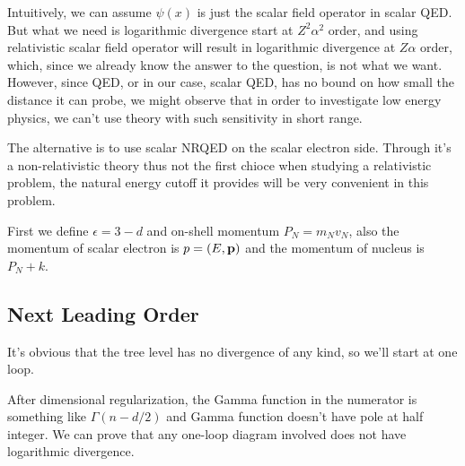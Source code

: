 \documentclass[aps,prd,preprint,showkeys,notitlepage,10pt]{revtex4-1}
\newcommand{\vbp}{\vb{p}}
\renewcommand{\a}{\alpha}
\begin{document}
Intuitively, we can assume $\psi(x)$ is just the scalar field operator in scalar QED. But what we need is logarithmic divergence start at $Z^2\a^2$ order, and using relativistic scalar field operator will result in logarithmic divergence at $Z\a$ order, which, since we already know the answer to the question, is not what we want. However, since QED, or in our case, scalar QED, has no bound on how small the distance it can probe, we might observe that in order to investigate low energy physics, we can't use theory with such sensitivity in short range.

The alternative is to use scalar NRQED on the scalar electron side. Through it's a non-relativistic theory thus not the first chioce when studying a relativistic problem, the natural energy cutoff it provides will be very convenient in this problem.

First we define $\epsilon=3-d$ and on-shell momentum $P_N=m_Nv_N$, also the momentum of scalar electron is $p=(E,\vbp)$ and the momentum of nucleus is $P_N+k$.
\subsection{Next Leading Order}
It's obvious that the tree level has no divergence of any kind, so we'll start at one loop.

After dimensional regularization, the Gamma function in the numerator is something like $\Gamma(n-d/2)$ and Gamma function doesn't have pole at half integer. We can prove that any one-loop diagram involved does not have logarithmic divergence.

\end{document}

